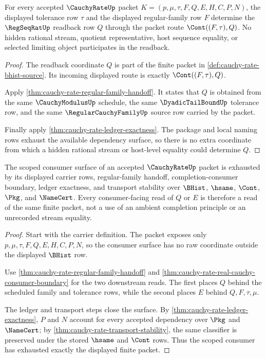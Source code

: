\begin{theorem}
\label{thm:cauchy-rate-tolerance-readback-exactness}
For every accepted $\CauchyRateUp$ packet $K=(p,\mu,\tau,F,Q,E,H,C,P,N)$, the displayed tolerance row $\tau$ and the displayed regular-family row $F$ determine the $\RegSeqRatUp$ readback row $Q$ through the packet route $\Cont((F,\tau),Q)$. No hidden rational stream, quotient representative, host sequence equality, or selected limiting object participates in the readback.
\end{theorem}
\begin{proof}
The readback coordinate $Q$ is part of the finite packet in \autoref{def:cauchy-rate-bhist-source}. Its incoming displayed route is exactly $\Cont((F,\tau),Q)$.

Apply \autoref{thm:cauchy-rate-regular-family-handoff}. It states that $Q$ is obtained from the same $\CauchyModulusUp$ schedule, the same $\DyadicTailBoundUp$ tolerance row, and the same $\RegularCauchyFamilyUp$ source row carried by the packet.

Finally apply \autoref{thm:cauchy-rate-ledger-exactness}. The package and local naming rows exhaust the available dependency surface, so there is no extra coordinate from which a hidden rational stream or host-level equality could determine $Q$.
\end{proof}

\begin{theorem}
\label{thm:cauchy-rate-scoped-consumer-exhaustion}
The scoped consumer surface of an accepted $\CauchyRateUp$ packet is exhausted by its displayed carrier rows, regular-family handoff, completion-consumer boundary, ledger exactness, and transport stability over $\BHist$, $\hsame$, $\Cont$, $\Pkg$, and $\NameCert$. Every consumer-facing read of $Q$ or $E$ is therefore a read of the same finite packet, not a use of an ambient completion principle or an unrecorded stream equality.
\end{theorem}
\begin{proof}
Start with the carrier definition. The packet exposes only $p,\mu,\tau,F,Q,E,H,C,P,N$, so the consumer surface has no raw coordinate outside the displayed $\BHist$ row.

Use \autoref{thm:cauchy-rate-regular-family-handoff} and \autoref{thm:cauchy-rate-real-cauchy-consumer-boundary} for the two downstream reads. The first places $Q$ behind the scheduled family and tolerance rows, while the second places $E$ behind $Q,F,\tau,\mu$.

The ledger and transport steps close the surface. By \autoref{thm:cauchy-rate-ledger-exactness}, $P$ and $N$ account for every accepted dependency over $\Pkg$ and $\NameCert$; by \autoref{thm:cauchy-rate-transport-stability}, the same classifier is preserved under the stored $\hsame$ and $\Cont$ rows. Thus the scoped consumer has exhausted exactly the displayed finite packet.
\end{proof}

